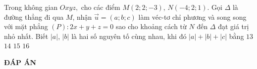 \begin{ex}%
Trong không gian $Oxyz,$ cho các điểm $M\left( 2;2;-3 \right)$, $N\left( -4;2;1 \right)$. Gọi $\Delta $ là đường thẳng đi qua $M$, nhận $\overrightarrow{u}=(a;b;c)$ làm véc-tơ chỉ phương và song song với mặt phẳng $(P)\colon 2x+y+z=0$ sao cho khoảng cách từ $N$ đến $\Delta $ đạt giá trị nhỏ nhất. Biết $|a|$, $|b|$ là hai số nguyên tố cùng nhau, khi đó $|a|+|b|+|c|$ bằng
\choice
{$13$ }
{$14$}
{ \True $15$}
{$16$}
\end{ex}

\newpage
\begin{center}
	\textbf{ĐÁP ÁN}
\end{center}
\begin{multicols}{10}
	
\end{multicols}

